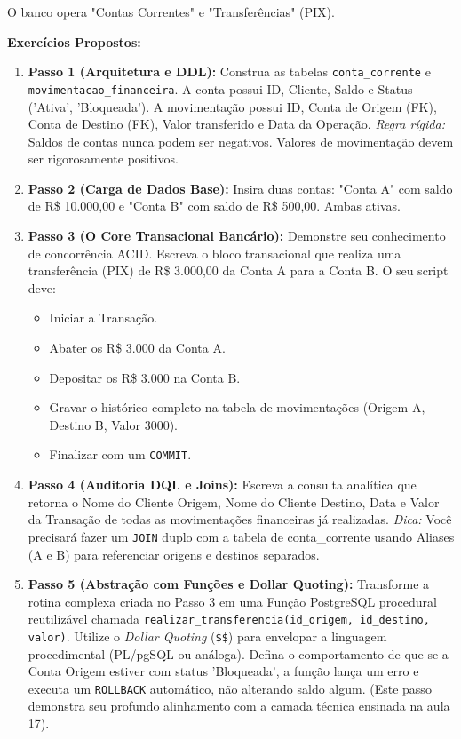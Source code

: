 O banco opera "Contas Correntes" e "Transferências" (PIX).

\textbf{Exercícios Propostos:}

\begin{enumerate}
    \item \textbf{Passo 1 (Arquitetura e DDL):} Construa as tabelas \texttt{conta\_corrente} e \texttt{movimentacao\_financeira}. 
    A conta possui ID, Cliente, Saldo e Status ('Ativa', 'Bloqueada').
    A movimentação possui ID, Conta de Origem (FK), Conta de Destino (FK), Valor transferido e Data da Operação.
    \textit{Regra rígida:} Saldos de contas nunca podem ser negativos. Valores de movimentação devem ser rigorosamente positivos.

    \item \textbf{Passo 2 (Carga de Dados Base):} Insira duas contas: "Conta A" com saldo de R\$ 10.000,00 e "Conta B" com saldo de R\$ 500,00. Ambas ativas.

    \item \textbf{Passo 3 (O Core Transacional Bancário):} Demonstre seu conhecimento de concorrência ACID. Escreva o bloco transacional que realiza uma transferência (PIX) de R\$ 3.000,00 da Conta A para a Conta B. O seu script deve:
    \begin{itemize}
        \item Iniciar a Transação.
        \item Abater os R\$ 3.000 da Conta A.
        \item Depositar os R\$ 3.000 na Conta B.
        \item Gravar o histórico completo na tabela de movimentações (Origem A, Destino B, Valor 3000).
        \item Finalizar com um \texttt{COMMIT}.
    \end{itemize}
    
    \item \textbf{Passo 4 (Auditoria DQL e Joins):} Escreva a consulta analítica que retorna o Nome do Cliente Origem, Nome do Cliente Destino, Data e Valor da Transação de todas as movimentações financeiras já realizadas. \textit{Dica:} Você precisará fazer um \texttt{JOIN} duplo com a tabela de conta\_corrente usando Aliases (A e B) para referenciar origens e destinos separados.

    \item \textbf{Passo 5 (Abstração com Funções e Dollar Quoting):} Transforme a rotina complexa criada no Passo 3 em uma Função PostgreSQL procedural reutilizável chamada \texttt{realizar\_transferencia(id\_origem, id\_destino, valor)}. Utilize o \textit{Dollar Quoting} (\texttt{\$\$}) para envelopar a linguagem procedimental (PL/pgSQL ou análoga). Defina o comportamento de que se a Conta Origem estiver com status 'Bloqueada', a função lança um erro e executa um \texttt{ROLLBACK} automático, não alterando saldo algum. (Este passo demonstra seu profundo alinhamento com a camada técnica ensinada na aula 17).
\end{enumerate}
